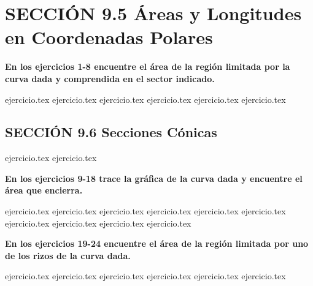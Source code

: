 
\section*{SECCIÓN 9.5 \quad Áreas y Longitudes en Coordenadas Polares}

\noindent\textbf{En los ejercicios 1-8 encuentre el área de la región limitada por la curva dada y comprendida en el sector indicado.}
\begin{enumerate}
    {ejercicio.tex}
{ejercicio.tex}
{ejercicio.tex}
{ejercicio.tex}
{ejercicio.tex}
{ejercicio.tex}
\end{enumerate}

\subsection*{SECCIÓN 9.6 \quad Secciones Cónicas}

\begin{enumerate}
    \setcounter{enumi}{6}
    {ejercicio.tex}
{ejercicio.tex}
\end{enumerate}

\noindent\textbf{En los ejercicios 9-18 trace la gráfica de la curva dada y encuentre el área que encierra.}
\begin{enumerate}
    \setcounter{enumi}{8}
    {ejercicio.tex}
{ejercicio.tex}
{ejercicio.tex}
{ejercicio.tex}
{ejercicio.tex}
{ejercicio.tex}
{ejercicio.tex}
{ejercicio.tex}
{ejercicio.tex}
{ejercicio.tex}
\end{enumerate}

\vspace{0.3cm}
\noindent\textbf{En los ejercicios 19-24 encuentre el área de la región limitada por uno de los rizos de la curva dada.}
\begin{enumerate}
    \setcounter{enumi}{18}
    {ejercicio.tex}
{ejercicio.tex}
{ejercicio.tex}
{ejercicio.tex}
{ejercicio.tex}
{ejercicio.tex}
\end{enumerate}

